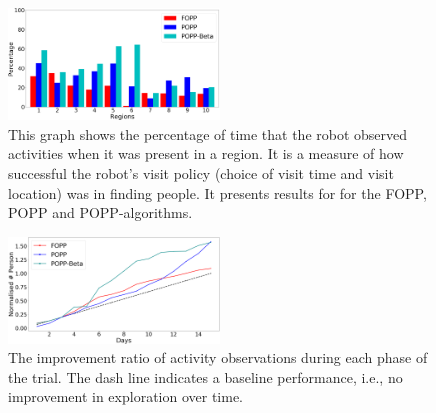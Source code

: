 \begin{figure}[t!]
	\centering
	\includegraphics[width=0.5\textwidth]{./figures/exploration_percentage_region.png}
	\caption{This graph shows the percentage of time that the robot observed activities when it was present in a region. It is a measure of how successful the robot's visit policy (choice of visit time and visit location) was in finding people. It presents results for for the FOPP, POPP and POPP-algorithms. %
	}
	\label{fig:exploration_percentage_region}
\end{figure}



\begin{figure}[t!]
	\centering
	\includegraphics[width=0.5\textwidth]{./figures/exploration_number_people_across_days_normalised.png}
	\caption{The improvement ratio of activity observations during each phase of the trial. The dash line indicates a baseline performance, i.e., no improvement in exploration over time.}
	\label{fig:exploration_improvement_ratio}
\end{figure}

